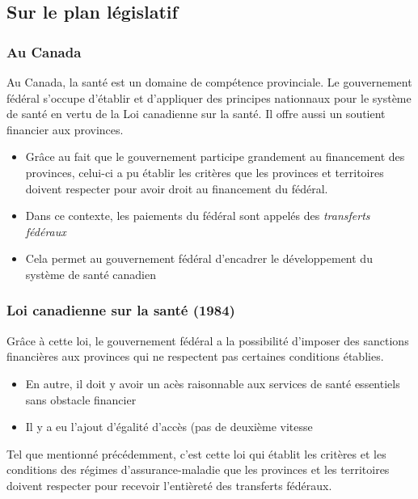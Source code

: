 \documentclass[10pt, french]{article}
\begin{document}
\begin{multicols*}{3}
\subsection{Sur le plan législatif}
\subsubsection*{Au Canada}
Au Canada, la santé est un domaine de compétence provinciale. Le gouvernement fédéral s'occupe d'établir et d'appliquer des principes nationnaux pour le système de santé en vertu de la Loi canadienne sur la santé. Il offre aussi un soutient financier aux provinces.
	\begin{itemize}
	\item 	Grâce au fait que le gouvernement participe grandement au financement des provinces, celui-ci a pu établir les critères que les provinces et territoires doivent respecter pour avoir droit au financement du fédéral. 
	\item	Dans ce contexte, les paiements du fédéral sont appelés des \textit{transferts fédéraux}
	\item	Cela permet au gouvernement fédéral d'encadrer le développement du système de santé canadien
	\end{itemize}
\subsubsection*{Loi canadienne sur la santé (1984)}
Grâce à cette loi, le gouvernement fédéral a la possibilité d'imposer des sanctions financières aux provinces qui ne respectent pas certaines conditions établies.
	\begin{itemize}
	\item 	En autre, il doit y avoir un acès raisonnable aux services de santé essentiels sans obstacle financier
	\item	Il y a eu l'ajout d'égalité d'accès (pas de deuxième vitesse
	\end{itemize}
Tel que mentionné précédemment, c'est cette loi qui établit les critères et les conditions des régimes d'assurance-maladie que les provinces et les territoires doivent respecter pour recevoir l'entièreté des transferts fédéraux.

\end{multicols*}
\end{document}
